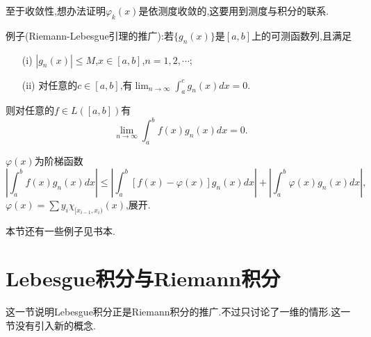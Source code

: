 \documentclass[12pt,a4paper,openany]{book}
\begin{document}
\begin{enumerate}
至于收敛性,想办法证明$\varphi_k(x)$是依测度收敛的,这要用到测度与积分的联系.

例子(Riemann-Lebesgue引理的推广):若$\{g_n(x)\}$是$[a,b]$上的可测函数列,且满足
\begin{enumerate}
\item[(i)]$|g_n(x)| \le M$,$x \in [a,b]$,$n=1,2,\cdots$;
\item[(ii)]对任意的$c \in [a,b]$,有$\lim_{n \rightarrow \infty}{\int_{a}^{c}{g_n(x)dx}} = 0$.
\end{enumerate}
则对任意的$f \in L([a,b])$有
\[
\lim_{n \rightarrow \infty}{\int_{a}^{b}{f(x)g_n(x)dx}} = 0.
\]

$\varphi(x)$为阶梯函数
\[
|\int_{a}^{b}{f(x)g_n(x)dx}| \le |\int_{a}^{b}{[f(x) - \varphi(x)]g_n(x)dx}| + |\int_{a}^{b}{\varphi(x)g_n(x)dx}|,
\]
$\varphi(x) = \sum{y_i\chi_{[x_{i-1}, x_i)}(x)}$,展开.
\end{enumerate}

本节还有一些例子见书本.

\section{Lebesgue积分与Riemann积分}
这一节说明Lebesgue积分正是Riemann积分的推广.不过只讨论了一维的情形.这一节没有引入新的概念.
\end{document}
